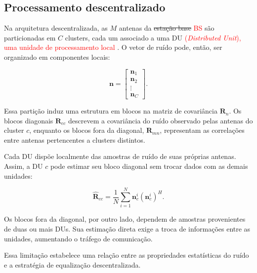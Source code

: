 \subsection{Processamento descentralizado}\label{subsec:dbp}

Na arquitetura descentralizada, as $M$ antenas da \sout{estação base} \textcolor{red}{BS} são particionadas em $C$ clusters, cada um associado a uma DU \textcolor{red}{(\textit{Distributed Unit}), uma unidade de processamento local \cite{zhao2025jsac}}. O vetor de ruído pode, então, ser organizado em componentes locais:

\[
\mathbf n=
\begin{bmatrix}
\mathbf n_1\\
\mathbf n_2\\
\vdots\\
\mathbf n_C
\end{bmatrix}.
\]

Essa partição induz uma estrutura em blocos na matriz de covariância $\mathbf R_n$. Os blocos diagonais $\mathbf R_{cc}$ descrevem a covariância do ruído observado pelas antenas do cluster $c$, enquanto os blocos fora da diagonal, $\mathbf R_{mn}$, representam as correlações entre antenas pertencentes a clusters distintos.

Cada DU dispõe localmente das amostras de ruído de suas próprias antenas. Assim, a DU $c$ pode estimar seu bloco diagonal sem trocar dados com as demais unidades:

\[
\hat{\mathbf R}_{cc}=
\frac{1}{N}
\sum_{i=1}^{N}
\mathbf n_c^i(\mathbf n_c^i)^H.
\]

Os blocos fora da diagonal, por outro lado, dependem de amostras provenientes de duas ou mais DUs. Sua estimação direta exige a troca de informações entre as unidades, aumentando o tráfego de comunicação.

Essa limitação estabelece uma relação entre as propriedades estatísticas do ruído e a estratégia de equalização descentralizada. 
